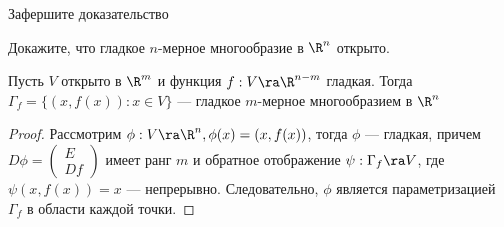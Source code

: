\begin{problem}
    Зафершите доказательство
\end{problem}

\begin{problem}
    Докажите, что гладкое \(n\)-мерное многообразие в \(\R^n\) открыто.
\end{problem}

\begin{example}
    Пусть \(V\) открыто в \(\R^m\) и функция \(f: V \ra \R^{n - m}\) гладкая. Тогда \(\Gamma_f = \{(x, f(x)) : x \in V\}\) --- гладкое \(m\)-мерное многообразием в \(\R^n\)
\end{example}
\begin{proof}
    Рассмотрим \(\phi: V \ra \R^n, \phi(x) = (x, f(x))\), тогда \(\phi\) --- гладкая, причем \(D\phi = \left( \begin{array}{c}
        E \\
        Df
    \end{array} \right)\) имеет ранг \(m\) и обратное отображение \(\psi: \Gamma_f \ra V\), где \(\psi(x, f(x)) = x\) --- непрерывно. Следовательно, \(\phi\) является параметризацией \(\Gamma_f\) в области каждой точки.
\end{proof}

